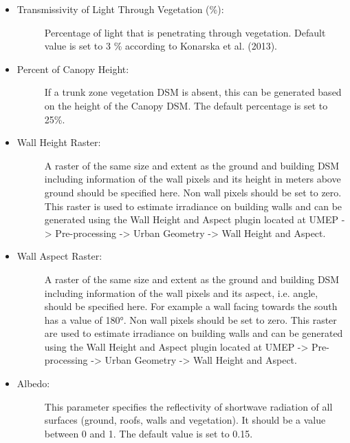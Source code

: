 \documentclass[letterpaper,10pt,english]{sphinxmanual}
\begin{document}
\begin{itemize}
\item {} \begin{description}
\item[{Transmissivity of Light Through Vegetation (\%):}] \leavevmode
Percentage of light that is penetrating through vegetation. Default value is set to 3 \% according to Konarska et al. (2013).

\end{description}

\item {} \begin{description}
\item[{Percent of Canopy Height:}] \leavevmode
If a trunk zone vegetation DSM is absent, this can be generated based on the height of the Canopy DSM. The default percentage is set to 25\%.

\end{description}

\item {} \begin{description}
\item[{Wall Height Raster:}] \leavevmode
A raster of the same size and extent as the ground and building DSM including information of the wall pixels and its height in meters above ground should be specified here. Non wall pixels should be set to zero. This raster is used to estimate irradiance on building walls and can be generated using the Wall Height and Aspect plugin located at UMEP  -\textgreater{} Pre-processing  -\textgreater{} Urban Geometry  -\textgreater{} Wall Height and Aspect.

\end{description}

\item {} \begin{description}
\item[{Wall Aspect Raster:}] \leavevmode
A raster of the same size and extent as the ground and building DSM including information of the wall pixels and its aspect, i.e. angle, should be specified here. For example a wall facing towards the south has a value of 180°. Non wall pixels should be set to zero. This raster are used to estimate irradiance on building walls and can be generated using the Wall Height and Aspect plugin located at UMEP  -\textgreater{} Pre-processing  -\textgreater{} Urban Geometry  -\textgreater{} Wall Height and Aspect.

\end{description}

\item {} \begin{description}
\item[{Albedo:}] \leavevmode
This parameter specifies the reflectivity of shortwave radiation of all surfaces (ground, roofs, walls and vegetation). It should be a value between 0 and 1. The default value is set to 0.15.


\end{description}
\end{itemize}
\end{document}
